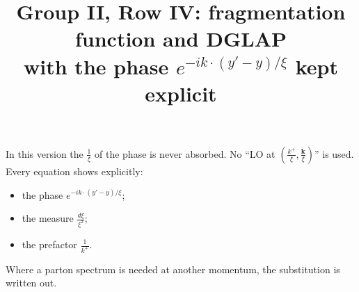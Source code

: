 \documentclass[10pt]{article}
\title{Group II, Row IV: fragmentation function and DGLAP\\[2pt]\large with the phase $e^{-ik\cdot(y'-y)/\xi}$ kept explicit}
\date{}
\numberwithin{equation}{section}
\begin{document}
\maketitle
\noindent In this version the $\frac1\xi$ of the phase is never absorbed. No ``LO at $(\frac{k^+}{\xi},\frac{\mathbf k}{\xi})$'' is used. Every equation shows explicitly:
\begin{itemize}
\item the phase $e^{-ik\cdot(y'-y)/\xi}$;
\item the measure $\frac{d\xi}{\xi^2}$;
\item the prefactor $\frac{1}{k^+}$.
\end{itemize}
Where a parton spectrum is needed at another momentum, the substitution is written out.

\end{document}
